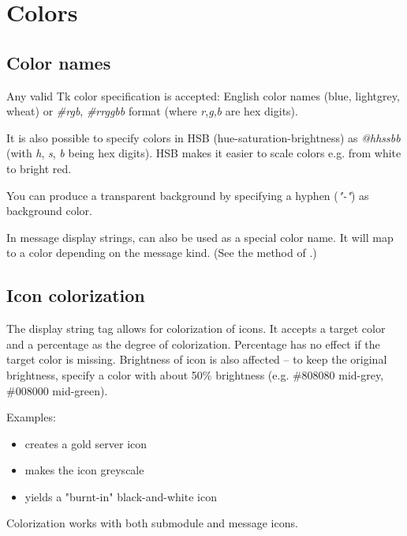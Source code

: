 \section{Colors}
\label{sec:ch-graphics:colors}

\subsection{Color names}

Any valid Tk color specification is accepted: English color names
(blue, lightgrey, wheat) or \textit{\#rgb}, \textit{\#rrggbb} format
(where \textit{r},\textit{g},\textit{b} are hex digits).

It is also possible to specify colors in HSB (hue-saturation-brightness) as
\textit{@hhssbb} (with \textit{h}, \textit{s}, \textit{b} being hex digits).
HSB makes it easier to scale colors e.g. from white to bright red.

You can produce a transparent background by specifying a hyphen (\textit{"-"})
as background color.

In message display strings,  can also be used as a special color name.
It will map to a color depending on the message kind.
(See the  method of .)

\subsection{Icon colorization}

The  display string tag allows for colorization of icons.
It accepts a target color and a percentage as the degree of colorization.
Percentage has no effect if the target color is missing.
Brightness of icon is also affected -- to keep the original brightness,
specify a color with about 50\% brightness (e.g. \#808080 mid-grey,
\#008000 mid-green).

Examples:

\begin{itemize}
  \item {} creates a gold server icon
  \item {} makes the icon greyscale
  \item {} yields a "burnt-in" black-and-white icon
\end{itemize}

Colorization works with both submodule and message icons.


